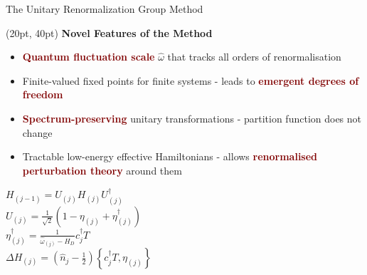 \documentclass[aspectratio=169]{beamer}
\newcommand{\head}[1]{
\begin{textblock*}{\textwidth}(20pt, 40pt)
\textbf{\Large {#1}}
\end{textblock*}
}
\newcommand{\focus}[1]{\textcolor{maroon}{\textbf{#1}}}
\begin{document}
\begin{frame}[noframenumbering]{The Unitary Renormalization Group Method}
\head{Novel Features of the Method}
\begin{minipage}{0.65\textwidth}
\begin{itemize}[<+-|alert@+>]
	\item \focus{Quantum fluctuation scale} \(\hat \omega\)	that tracks all orders of renormalisation\\[10pt]
	\item Finite-valued fixed points for finite systems - leads to \focus{emergent degrees of freedom}\\[10pt]
	\item \focus{Spectrum-preserving} unitary transformations - partition function does not change\\[10pt]
	\item Tractable low-energy effective Hamiltonians - allows \focus{renormalised perturbation theory} around them 
\end{itemize}
\end{minipage}
\hspace*{\fill}
\begin{minipage}{0.3\textwidth}
\begin{flushleft}
	\(H_{(j-1)} = U_{(j)} H_{(j)} U_{(j)}^\dagger\)\\[15pt]
	\(U_{(j)} = \frac{1}{\sqrt 2}\left(1 - \eta_{(j)} + \eta_{(j)}^\dagger\right) \)\\[15pt]
	\( \eta^\dagger_{(j)} = \frac{1}{\hat \omega_{(j)} - H_D}c^\dagger_j T\)\\[15pt]
	\( \Delta H_{(j)} = \left(\hat n_j - \frac{1}{2}\right) \left\{c^\dagger_j T, \eta_{(j)}\right\} \)
\end{flushleft}
\end{minipage}
\end{frame}
\end{document}
